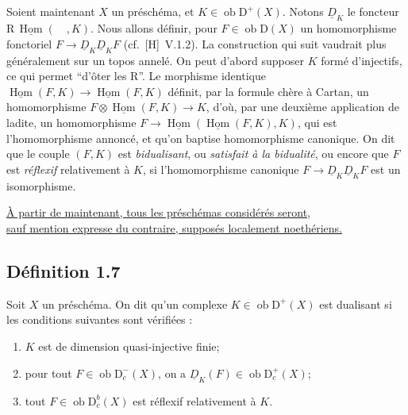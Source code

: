 \documentclass[11pt]{article}
\DeclareMathOperator{\Hom}{Hom}
\newcommand{\R}{\mathrm{R}}\newcommand{\RHomCore}{\mathrm{RHom}}
\newcommand{\D}{\mathrm{D}}
\newcommand{\ob}{\operatorname{ob}}
\providecommand{\Hom}{\operatorname{Hom}}
\providecommand{\ob}{\operatorname{ob}}
\providecommand{\R}{\mathrm R}
\providecommand{\Hom}{\operatorname{Hom}}
\begin{document}
Soient maintenant $X$ un préschéma, et $K \in \ob \D^{+}(X)$. Notons $\underline{D}_K$ le foncteur $\R\,\underline{\Hom}(\quad, K)$. Nous allons définir, pour $F \in \ob \D(X)$ un homomorphisme fonctoriel $F \to \underline{D}_K \underline{D}_K F$ (cf.~[H]~V.1.2). La construction qui suit vaudrait plus généralement sur un topos annelé. On peut d'abord supposer $K$
formé d'injectifs, ce qui permet ``d'ôter les $\R$''. Le morphisme identique $\underline{\Hom}(F,K) \to \underline{\Hom}(F,K)$ définit, par la formule chère à Cartan, un homomorphisme $F \otimes \underline{\Hom}(F,K) \to K$, d'où, par une deuxième application de ladite, un homomorphisme $F \to \underline{\Hom}(\underline{\Hom}(F,K), K)$, qui est l'homomorphisme annoncé, et qu'on baptise homomorphisme canonique. On dit que le couple $(F,K)$ est \emph{bidualisant}, ou \emph{satisfait à la bidualité}, ou encore que $F$ est \emph{réflexif} relativement à $K$, si l'homomorphisme canonique $F \to \underline{D}_K \underline{D}_K F$ est un isomorphisme.

\noindent\underline{À partir de maintenant, tous les préschémas considérés seront,}\\[-0.1em]\underline{sauf mention expresse du contraire, supposés localement noethériens.}

\subsection*{Définition 1.7}
Soit $X$ un préschéma. On dit qu'un complexe $K \in \ob \D^{+}(X)$ est dualisant si les conditions suivantes sont vérifiées :
\begin{enumerate}[label=(\roman*)]
\item $K$ est de dimension quasi-injective finie;
\item pour tout $F \in \ob \D_c^{-}(X)$, on a $\underline{D}_K(F) \in \ob \D_c^{+}(X)$;
\item tout $F \in \ob \D_c^{b}(X)$ est réflexif relativement à $K$.
\end{enumerate}
\end{document}
